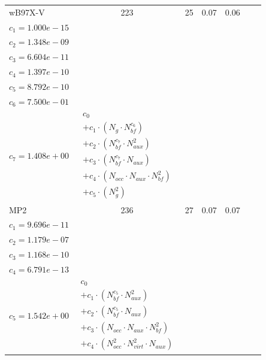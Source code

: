 \begin{longtable}{|l|c|c|c|c|p{3.2cm}|p{5.0cm}|}
wB97X-V & 223 & 25 & 0.07 & 0.06 & \begin{tabular}{l}\(c_{0}=5.304e-10\) \\ \(c_{1}=1.000e-15\) \\ \(c_{2}=1.348e-09\) \\ \(c_{3}=6.604e-11\) \\ \(c_{4}=1.397e-10\) \\ \(c_{5}=8.792e-10\) \\ \(c_{6}=7.500e-01\) \\ \(c_{7}=1.408e+00\)\end{tabular} & $\begin{array}{l}c_{0} \\ + c_{1}  \cdot  (N_{g}  \cdot  N_{bf} ^{c_{6}}) \\ + c_{2}  \cdot  (N_{bf} ^{c_{7}}  \cdot  N_{aux}^{2}) \\ + c_{3}  \cdot  (N_{bf} ^{c_{7}}  \cdot  N_{aux}) \\ + c_{4}  \cdot  (N_{occ}  \cdot  N_{aux}  \cdot  N_{bf} ^{2}) \\ + c_{5}  \cdot  (N_{g} ^{2})\end{array}$ \\ 
\hline
MP2 & 236 & 27 & 0.07 & 0.07 & \begin{tabular}{l}\(c_{0}=4.381e+00\) \\ \(c_{1}=9.696e-11\) \\ \(c_{2}=1.179e-07\) \\ \(c_{3}=1.168e-10\) \\ \(c_{4}=6.791e-13\) \\ \(c_{5}=1.542e+00\)\end{tabular} & $\begin{array}{l}c_{0} \\ + c_{1}  \cdot  (N_{bf} ^{c_{5}}  \cdot  N_{aux} ^{2}) \\ + c_{2}  \cdot  (N_{bf} ^{c_{5}}  \cdot  N_{aux}) \\ + c_{3}  \cdot  (N_{occ}  \cdot  N_{aux}  \cdot  N_{bf} ^{2}) \\ + c_{4}  \cdot  (N_{occ} ^{2}  \cdot  N_{virt} ^{2}  \cdot  N_{aux})\end{array}$ \\ 
\hline

\end{longtable}
